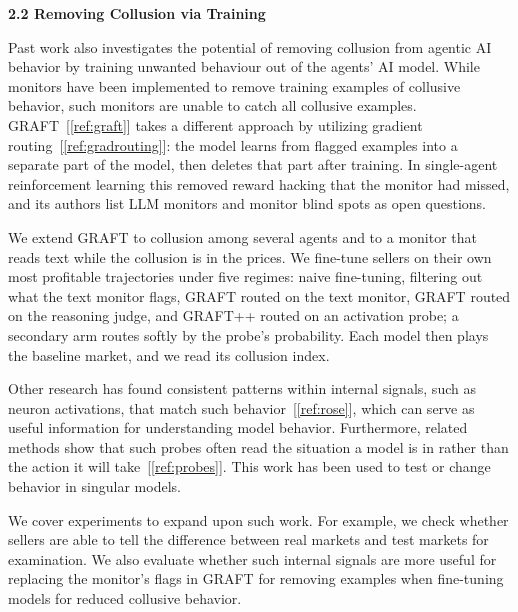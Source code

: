 \documentclass[11pt,letterpaper]{article}
\newcommand{\gap}{\par\vspace{\baselineskip}}   %
\newcommand{\subsubhead}[1]{\gap{\noindent\bfseries #1\par}\nopagebreak\gap}
\begin{document}
{\noindent\bfseries 2.2 Removing Collusion via Training\par}
\gap
Past work also investigates the potential of removing collusion from agentic AI behavior by training unwanted behaviour out of the agents' AI model. While monitors have been implemented to remove training examples of collusive behavior, such monitors are unable to catch all collusive examples. GRAFT~[\ref{ref:graft}] takes a different approach by utilizing gradient routing~[\ref{ref:gradrouting}]: the model learns from flagged examples into a separate part of the model, then deletes that part after training. In single-agent reinforcement learning this removed reward hacking that the monitor had missed, and its authors list LLM monitors and monitor blind spots as open questions.
\gap
We extend GRAFT to collusion among several agents and to a monitor that reads text while the collusion is in the prices. We fine-tune sellers on their own most profitable trajectories under five regimes: naive fine-tuning, filtering out what the text monitor flags, GRAFT routed on the text monitor, GRAFT routed on the reasoning judge, and GRAFT++ routed on an activation probe; a secondary arm routes softly by the probe's probability. Each model then plays the baseline market, and we read its collusion index.

\subsubhead{2.3 Looking Under the Hood}
Other research has found consistent patterns within internal signals, such as neuron activations, that match such behavior~[\ref{ref:rose}], which can serve as useful information for understanding model behavior. Furthermore, related methods show that such probes often read the situation a model is in rather than the action it will take~[\ref{ref:probes}]. This work has been used to test or change behavior in singular models.
\gap
We cover experiments to expand upon such work. For example, we check whether sellers are able to tell the difference between real markets and test markets for examination. We also evaluate whether such internal signals are more useful for replacing the monitor's flags in GRAFT for removing examples when fine-tuning models for reduced collusive behavior.
\end{document}
